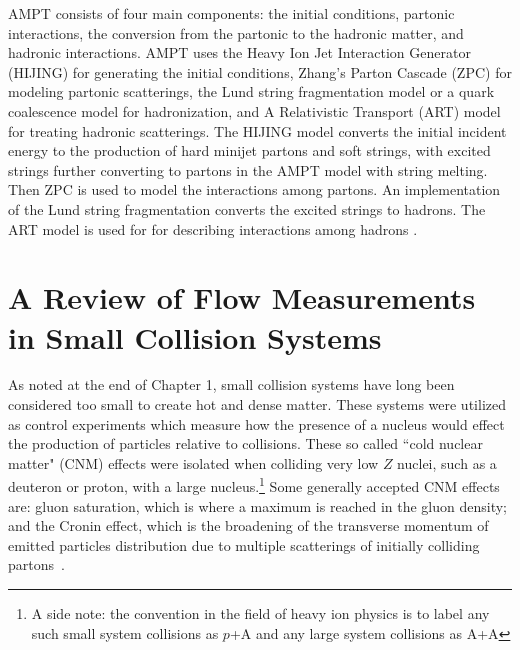 AMPT consists of four main components: the initial conditions, partonic interactions, the conversion from the partonic to the hadronic matter, and hadronic interactions. AMPT uses the Heavy Ion Jet Interaction Generator (HIJING) for generating the initial conditions, Zhang's Parton Cascade (ZPC) for modeling partonic scatterings, the Lund string fragmentation model or a quark coalescence model for hadronization, and A Relativistic Transport (ART) model for treating hadronic scatterings. The HIJING model converts the initial incident energy to the production of hard minijet partons and soft strings, with excited strings further converting to partons in the AMPT model with string melting. Then ZPC is used to model the interactions among partons. An implementation of the Lund string fragmentation converts the excited strings to hadrons. The ART model is used for for describing interactions among hadrons \cite{PhysRevC.72.064901}.

\section{A Review of Flow Measurements in Small Collision Systems}
As noted at the end of Chapter 1, small collision systems have long been considered too small to create hot and dense matter. These systems were utilized as control experiments which measure how the presence of a nucleus would effect the production of particles relative to \pp collisions. These so called ``cold nuclear matter" (CNM) effects were isolated when colliding very low $Z$ nuclei, such as a deuteron or proton, with a large nucleus.\footnote{ A side note: the convention in the field of heavy ion physics is to label any such small system collisions as $p$+A and any large system collisions as A+A} Some generally accepted CNM effects are: gluon saturation, which is where a maximum is reached in the gluon density; and the Cronin effect, which is the broadening of the transverse momentum of emitted particles distribution due to multiple scatterings of initially colliding partons~\cite{Frawley:2012hv}.

